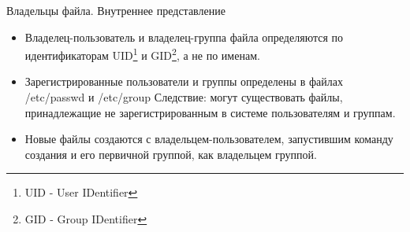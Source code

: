 \begin{frame}[fragile]{Владельцы файла. Внутреннее представление}
  \begin{itemize}
    \item \alert{Владелец-пользователь} и \alert{владелец-группа} файла определяются по идентификаторам \alert{UID}\footnote{UID - User IDentifier} и \alert{GID}\footnote{GID - Group IDentifier}, а не по именам. 
 \pause
    \item Зарегистрированные пользователи и группы определены в файлах \alert{/etc/passwd} и \alert{/etc/group} \newline
    Следствие: могут существовать файлы, принадлежащие не зарегистрированным в системе пользователям и группам. \pause
    \item Новые файлы создаются с владельцем-пользователем, запустившим команду создания и его первичной группой, как владельцем группой. \pause
  \end{itemize}

\end{frame}

